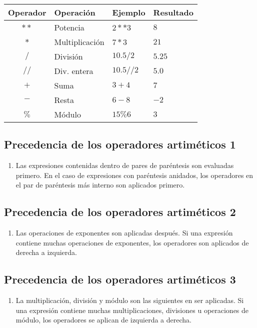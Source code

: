 \documentclass[]{article}
\providecommand{\tightlist}{%
  \setlength{\itemsep}{0pt}\setlength{\parskip}{0pt}}
\begin{document}
\begin{longtable}[]{@{}clll@{}}
\toprule
Operador & Operación & Ejemplo & Resultado\tabularnewline
\midrule
\endhead
\(**\) & Potencia & \(2**3\) & \(8\)\tabularnewline
\(*\) & Multiplicación & \(7*3\) & \(21\)\tabularnewline
\(/\) & División & \(10.5/2\) & \(5.25\)\tabularnewline
\(//\) & Div. entera & \(10.5//2\) & \(5.0\)\tabularnewline
\(+\) & Suma & \(3+4\) & \(7\)\tabularnewline
\(-\) & Resta & \(6-8\) & \(-2\)\tabularnewline
\(\%\) & Módulo & \(15\%6\) & \(3\)\tabularnewline
\bottomrule
\end{longtable}

\subsection{Precedencia de los operadores artiméticos
1}\label{precedencia-de-los-operadores-artimuxe9ticos-1}

\begin{enumerate}
\def\labelenumi{\arabic{enumi}.}
\tightlist
\item
  Las expresiones contenidas dentro de pares de paréntesis son evaluadas
  primero. En el caso de expresiones con paréntesis anidados, los
  operadores en el par de paréntesis más interno son aplicados primero.
\end{enumerate}

\subsection{Precedencia de los operadores artiméticos
2}\label{precedencia-de-los-operadores-artimuxe9ticos-2}

\begin{enumerate}
\def\labelenumi{\arabic{enumi}.}
\setcounter{enumi}{1}
\tightlist
\item
  Las operaciones de exponentes son aplicadas después. Si una expresión
  contiene muchas operaciones de exponentes, los operadores son
  aplicados de derecha a izquierda.
\end{enumerate}

\subsection{Precedencia de los operadores artiméticos
3}\label{precedencia-de-los-operadores-artimuxe9ticos-3}

\begin{enumerate}
\def\labelenumi{\arabic{enumi}.}
\setcounter{enumi}{2}
\tightlist
\item
  La multiplicación, división y módulo son las siguientes en ser
  aplicadas. Si una expresión contiene muchas multiplicaciones,
  divisiones u operaciones de módulo, los operadores se aplican de
  izquierda a derecha.
\end{enumerate}
\end{document}
